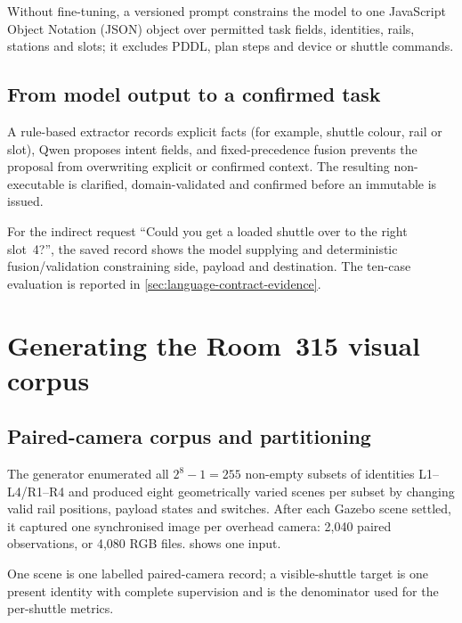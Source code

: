 Without fine-tuning, a versioned prompt constrains the model to one
 JavaScript Object Notation (JSON) object over permitted task fields,
identities, rails, stations and slots; it excludes PDDL, plan steps and device
or shuttle commands.

\subsection{From model output to a confirmed task}

A rule-based extractor records explicit facts (for example, shuttle colour,
rail or slot), Qwen proposes intent fields, and fixed-precedence fusion prevents
the proposal from overwriting explicit or confirmed context. The resulting
non-executable  is clarified, domain-validated and confirmed
before an immutable  is issued.

For the indirect request ``Could you get a loaded shuttle over to the right
slot~4?'', the saved record shows the model supplying
 and deterministic fusion/validation constraining
side, payload and destination. The ten-case evaluation is reported in
\cref{sec:language-contract-evidence}.

\section{Generating the Room~315 visual corpus}

\subsection{Paired-camera corpus and partitioning}

The generator enumerated all $2^8-1=255$ non-empty subsets of identities
L1--L4/R1--R4 and produced eight geometrically varied scenes per subset by
changing valid rail positions, payload states and switches. After each Gazebo
scene settled, it captured one synchronised image per overhead camera: 2,040
paired observations, or 4,080 RGB files. 
shows one input.

One scene is one labelled paired-camera record; a visible-shuttle target is one
present identity with complete supervision and is the denominator used for the
per-shuttle metrics.

